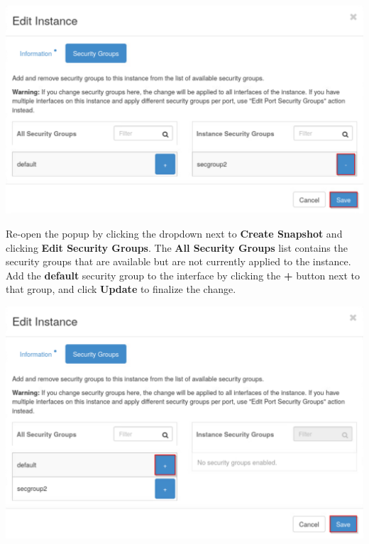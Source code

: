 \documentclass[letterpaper, 12pt]{article}
\begin{document}
\begin{enumerate}
\begin{labstep}
        \begin{center}
            \includegraphics[width=\linewidth]{images/part2/step19.png}
        \end{center}
    \end{labstep}

    \begin{labstep}
        Re-open the popup by clicking the dropdown next to \textbf{Create Snapshot} and clicking \textbf{Edit Security Groups}.
        The \textbf{All Security Groups} list contains the security groups that are available but are not currently applied to the instance.
        Add the \textbf{default} security group to the interface by clicking the \textbf{+} button next to that group, and click \textbf{Update} to finalize the change.

        \begin{center}
            \includegraphics[width=\linewidth]{images/part2/step20.png}
        \end{center}
    \end{labstep}


\end{enumerate}
\end{document}
